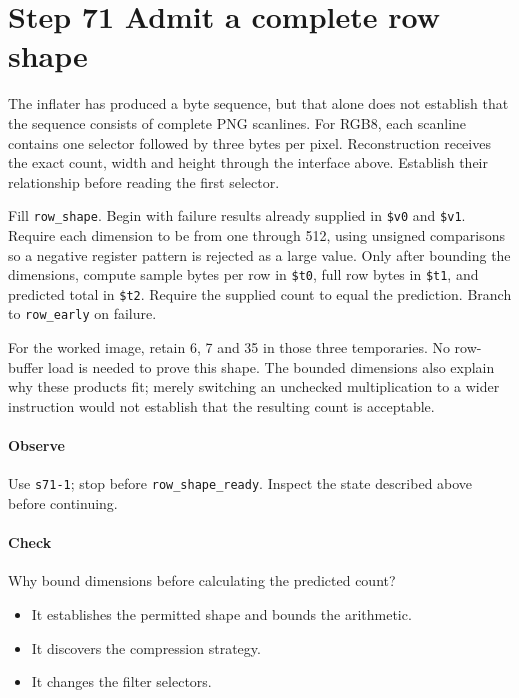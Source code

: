 \section{Step 71 Admit a complete row shape}
The inflater has produced a byte sequence, but that alone does not establish that the sequence consists of complete PNG scanlines. For RGB8, each scanline contains one selector followed by three bytes per pixel. Reconstruction receives the exact count, width and height through the interface above. Establish their relationship before reading the first selector.

Fill \texttt{row\_shape}. Begin with failure results already supplied in \texttt{\$v0} and \texttt{\$v1}. Require each dimension to be from one through 512, using unsigned comparisons so a negative register pattern is rejected as a large value. Only after bounding the dimensions, compute sample bytes per row in \texttt{\$t0}, full row bytes in \texttt{\$t1}, and predicted total in \texttt{\$t2}. Require the supplied count to equal the prediction. Branch to \texttt{row\_early} on failure.

For the worked image, retain 6, 7 and 35 in those three temporaries. No row-buffer load is needed to prove this shape. The bounded dimensions also explain why these products fit; merely switching an unchecked multiplication to a wider instruction would not establish that the resulting count is acceptable.

\paragraph{Observe} Use \texttt{s71-1}; stop before \texttt{row\_shape\_ready}. Inspect the state described above before continuing.

\paragraph{Check} Why bound dimensions before calculating the predicted count?
\begin{itemize}
\item[A.] It establishes the permitted shape and bounds the arithmetic.
\item[B.] It discovers the compression strategy.
\item[C.] It changes the filter selectors.
\end{itemize}
